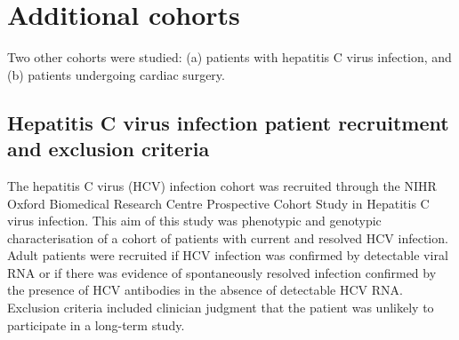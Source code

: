
\section{Additional cohorts}
Two other cohorts were studied: (a) patients with hepatitis C virus infection, and (b) patients undergoing cardiac surgery.

\subsection{Hepatitis C virus infection patient recruitment and exclusion criteria}
The hepatitis C virus (HCV) infection cohort was recruited through the NIHR Oxford Biomedical Research Centre Prospective Cohort Study in Hepatitis C virus infection. This aim of this study was phenotypic and genotypic characterisation of a cohort of patients with current and resolved HCV infection. Adult patients were recruited if HCV infection was confirmed by detectable viral RNA or if there was evidence of spontaneously resolved infection confirmed by the presence of HCV antibodies in the absence of detectable HCV RNA. Exclusion criteria included clinician judgment that the patient was unlikely to participate in a long-term study.

